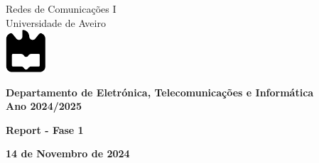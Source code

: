 \documentclass{report}
\begin{document}
%
\def\autores{Fábio Franco, Ricardo Domingues}
\def\empresa{Universidade de Aveiro}
\def\logotipo{ua.pdf}
%
%
\begin{titlepage}
    \centering
    {\LARGE {Redes de Comunicações I}}\\
    \vspace{0.5cm}
    {\LARGE Universidade de Aveiro}\\
    \vspace{1.5cm}
    \includegraphics[width=1.5cm]{code/images/ua.pdf} %
    \vspace{1.5cm}
    
    {\Large \textbf{Departamento de Eletrónica, Telecomunicações e Informática}}\\
    \vspace{0.5cm}
    {\large \textbf{Ano 2024/2025}}\\
    
    \vfill
    
    {\Large \textbf{Report - Fase 1}}\\
    \vspace{0.5cm}
    
    \vfill
    
    \vspace{2cm}
    \begin{center}
      \large \textbf{14 de Novembro de 2024}
    \end{center}
    \vspace{0.1cm}
    \begin{center}
    \end{center}
    
\end{titlepage}


\end{document}
